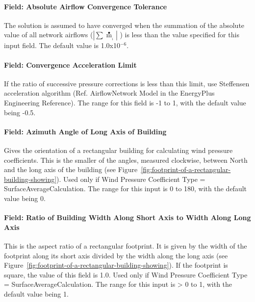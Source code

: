 \paragraph{Field: Absolute Airflow Convergence Tolerance}\label{field-absolute-airflow-convergence-tolerance}

The solution is assumed to have converged when the summation of the absolute value of all network airflows (\(\left| {\sum {{{\mathop m\limits^ \bullet }_{_i}}} } \right|\) ) is less than the value specified for this input field. The default value is 1.0x10\(^{-6}\).

\paragraph{Field: Convergence Acceleration Limit}\label{field-convergence-acceleration-limit}

If the ratio of successive pressure corrections is less than this limit, use Steffensen acceleration algorithm (Ref. AirflowNetwork Model in the EnergyPlus Engineering Reference). The range for this field is -1 to 1, with the default value being -0.5.

\paragraph{Field: Azimuth Angle of Long Axis of Building}\label{field-azimuth-angle-of-long-axis-of-building}

Gives the orientation of a rectangular building for calculating wind pressure coefficients. This is the smaller of the angles, measured clockwise, between North and the long axis of the building (see Figure~\ref{fig:footprint-of-a-rectangular-building-showing}). Used only if Wind Pressure Coefficient Type = SurfaceAverageCalculation. The range for this input is 0 to 180, with the default value being 0.

\paragraph{Field: Ratio of Building Width Along Short Axis to Width Along Long Axis}\label{field-ratio-of-building-width-along-short-axis-to-width-along-long-axis}

This is the aspect ratio of a rectangular footprint. It is given by the width of the footprint along its short axis divided by the width along the long axis (see Figure~\ref{fig:footprint-of-a-rectangular-building-showing}). If the footprint is square, the value of this field is 1.0. Used only if Wind Pressure Coefficient Type = SurfaceAverageCalculation. The range for this input is \textgreater{} 0 to 1, with the default value being 1.

